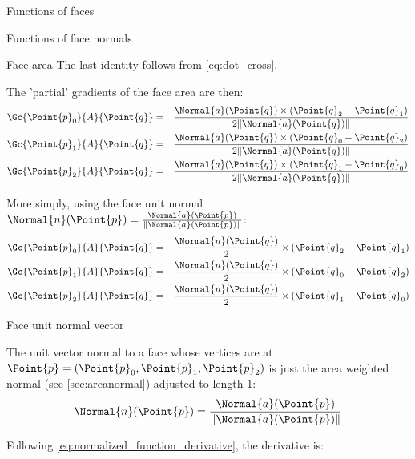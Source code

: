 \begin{plSection}{Functions of faces}
\begin{plSection}{Functions of face normals}
\begin{plSection}{Face area}
The last identity follows from \cref{eq:dot_cross}.

The 'partial' gradients of the face area are then:
\begin{eqnarray}
\Gc{\Point{p}_0}{A}{\Point{q}} & = & \frac{\Normal{a}(\Point{q}) \times (\Point{q}_2 - \Point{q}_1)}{2\|\Normal{a}(\Point{q})\|} \\
\Gc{\Point{p}_1}{A}{\Point{q}} & = & \frac{\Normal{a}(\Point{q}) \times (\Point{q}_0 - \Point{q}_2)}{2\|\Normal{a}(\Point{q})\|} \nonumber \\
\Gc{\Point{p}_2}{A}{\Point{q}} & = & \frac{\Normal{a}(\Point{q}) \times (\Point{q}_1 - \Point{q}_0)}{2\|\Normal{a}(\Point{q})\|} \nonumber
\end{eqnarray}

More simply, using the face unit normal \( \Normal{n}(\Point{p})  =  \frac{\Normal{a}(\Point{p})}{\| \Normal{a}(\Point{p}) \|} \):
\begin{eqnarray}
\label{eq:area_gradient}
\Gc{\Point{p}_0}{A}{\Point{q}} & = & \frac{\Normal{n}(\Point{q})}{2} \times (\Point{q}_2 - \Point{q}_1) \\
\Gc{\Point{p}_1}{A}{\Point{q}} & = & \frac{\Normal{n}(\Point{q})}{2} \times (\Point{q}_0 - \Point{q}_2) \nonumber \\
\Gc{\Point{p}_2}{A}{\Point{q}} & = & \frac{\Normal{n}(\Point{q})}{2} \times (\Point{q}_1 - \Point{q}_0) \nonumber
\end{eqnarray}

\end{plSection}%
\begin{plSection}{Face unit normal vector}
\label{sec:facenormal}

The unit vector normal to a face whose vertices are at
$\Point{p} = (\Point{p}_0,\Point{p}_1,\Point{p}_2)$ is just the area weighted normal (see \cref{sec:areanormal})
adjusted to length 1:
\begin{equation}
\Normal{n}(\Point{p})  =  \frac{\Normal{a}(\Point{p})}{\| \Normal{a}(\Point{p}) \|}
\end{equation}

Following \cref{eq:normalized_function_derivative}, the derivative is:


\end{plSection}
\end{plSection}
\end{plSection}
